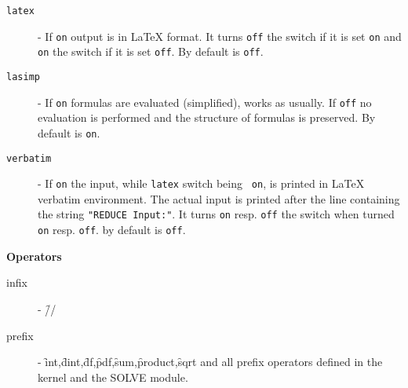 \hypertarget{switch:LATEX}{}
\hypertarget{switch:LASIMP}{}
\hypertarget{switch:VERBATIM}{}
\begin{description}
\item[\texttt{latex}]
  - If \texttt{on} output is in \LaTeX{} format. It turns \texttt{off} the 
  switch if it is set \texttt{on} and \texttt{on} the  switch
if it is set \texttt{off}. By default is \texttt{off}.
\item[\texttt{lasimp}]
- If \texttt{on} formulas are evaluated (simplified), \REDUCE{} works
as usually. If \texttt{off} no evaluation is performed and the structure
of formulas is preserved. By default is \texttt{on}.
\item[\texttt{verbatim}]
- If \texttt{on} the \REDUCE{} input, while \texttt{latex} switch being {\tt
on}, is printed in \LaTeX{} verbatim environment. The actual \REDUCE{}
input is printed after the line containing the string \texttt{"REDUCE
Input:"}.  It turns \texttt{on} resp. \texttt{off} the  switch when
turned \texttt{on} resp. \texttt{off}. by default is \texttt{off}.
\end{description}

\textbf{Operators}

\begin{description}
\item[infix] - \f{//}
\item[prefix] - \f{int},\f{dint},\f{df},\f{pdf},\f{sum},\f{product},\f{sqrt} and all \REDUCE{}
prefix operators defined in the \REDUCE{} kernel and the SOLVE module.
\end{description}

